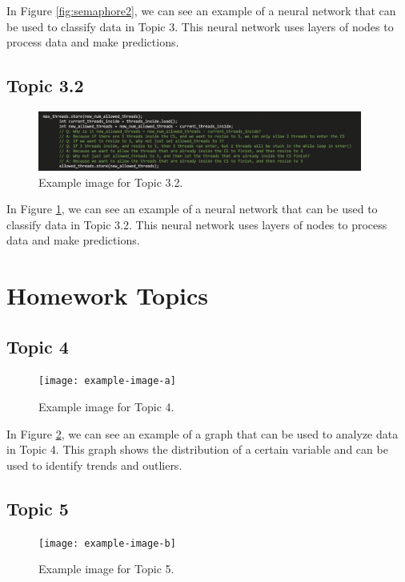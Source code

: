 \documentclass{article}
\begin{document}
In Figure \ref{fig:semaphore2}, we can see an example of a neural network that can be used to classify data in Topic 3. This neural network uses layers of nodes to process data and make predictions.

\subsection{Topic 3.2}

\begin{figure}[ht]
  \centering
  \includegraphics[width=0.95\textwidth]{semaphore2.png}
  \caption{Example image for Topic 3.2.}
  \label{fig:label3.2}
\end{figure}

In Figure \ref{fig:label3.2}, we can see an example of a neural network that can be used to classify data in Topic 3.2. This neural network uses layers of nodes to process data and make predictions.

\section{Homework Topics}

\subsection{Topic 4}

\begin{figure}[ht]
  \centering
  \texttt{[image: example-image-a]}
  \caption{Example image for Topic 4.}
  \label{fig:topic4}
\end{figure}

In Figure \ref{fig:topic4}, we can see an example of a graph that can be used to analyze data in Topic 4. This graph shows the distribution of a certain variable and can be used to identify trends and outliers.

\subsection{Topic 5}

\begin{figure}[ht]
  \centering
  \texttt{[image: example-image-b]}
  \caption{Example image for Topic 5.}
  \label{fig:5.5}
\end{figure}
\end{document}
